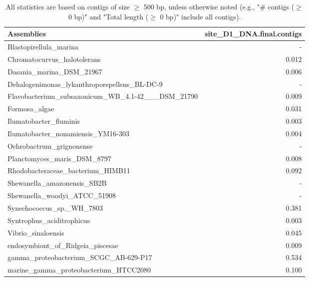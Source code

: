 \documentclass[12pt,a4paper]{article}
\begin{document}
\begin{table}[ht]
\begin{center}
\caption{All statistics are based on contigs of size $\geq$ 500 bp, unless otherwise noted (e.g., "\# contigs ($\geq$ 0 bp)" and "Total length ($\geq$ 0 bp)" include all contigs).}
\begin{tabular}{|l*{1}{|r}|}
\hline
Assemblies & site\_D1\_DNA.final.contigs \\ \hline
Blastopirellula\_marina & - \\ \hline
Chromatocurvus\_halotolerans & 0.012 \\ \hline
Dasania\_marina\_DSM\_21967 & 0.006 \\ \hline
Dehalogenimonas\_lykanthroporepellens\_BL-DC-9 & - \\ \hline
Flavobacterium\_subsaxonicum\_WB\_4.1-42\_\_\_DSM\_21790 & 0.009 \\ \hline
Formosa\_algae & 0.031 \\ \hline
Ilumatobacter\_fluminis & 0.003 \\ \hline
Ilumatobacter\_nonamiensis\_YM16-303 & 0.004 \\ \hline
Ochrobactrum\_grignonense & - \\ \hline
Planctomyces\_maris\_DSM\_8797 & 0.008 \\ \hline
Rhodobacteraceae\_bacterium\_HIMB11 & 0.092 \\ \hline
Shewanella\_amazonensis\_SB2B & - \\ \hline
Shewanella\_woodyi\_ATCC\_51908 & - \\ \hline
Synechococcus\_sp.\_WH\_7803 & 0.381 \\ \hline
Syntrophus\_aciditrophicus & 0.003 \\ \hline
Vibrio\_sinaloensis & 0.045 \\ \hline
endosymbiont\_of\_Ridgeia\_piscesae & 0.009 \\ \hline
gamma\_proteobacterium\_SCGC\_AB-629-P17 & 0.534 \\ \hline
marine\_gamma\_proteobacterium\_HTCC2080 & 0.100 \\ \hline
\end{tabular}
\end{center}
\end{table}
\end{document}
